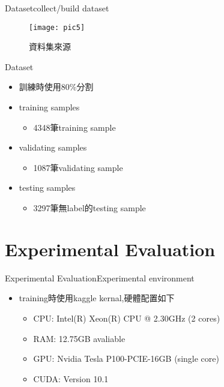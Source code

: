 \documentclass{beamer}
\begin{document}
\begin{CJK}{UTF8}{bsmi}
\begin{frame}{Dataset}{collect/build dataset}
\begin{figure}[H] %
\texttt{[image: pic5]} %
\caption{資料集來源} %
\end{figure}


\end{frame}
\begin{frame}{Dataset}
 \begin{itemize}
  \item {
訓練時使用80\%分割
  }
  \end{itemize}
  \begin{itemize}
  \item {
    training samples  
 	\begin{itemize}
    	\item
     	4348筆training sample
   	 \end{itemize}
  }
  \end{itemize}
 \begin{itemize}
  \item {
   validating samples 
 	\begin{itemize}
    	\item
     	 1087筆validating sample
   	 \end{itemize}
  }
  \end{itemize}
 \begin{itemize}
  \item {
    testing samples 
 	\begin{itemize}
    	\item
     	 3297筆無label的testing sample
   	 \end{itemize}
  }
  \end{itemize}

\end{frame}

\section{Experimental Evaluation}
\begin{frame}{Experimental Evaluation}{Experimental environment}
  \begin{itemize}
  \item {
    training時使用kaggle kernal,硬體配置如下
\begin{itemize}
  \item {
    CPU: Intel(R) Xeon(R) CPU @ 2.30GHz (2 cores)
  }
  \item {
    RAM: 12.75GB avaliable
  }
  \item {
    GPU: Nvidia Tesla P100-PCIE-16GB (single core) 
  }
 \item {
    CUDA: Version 10.1
  }
  \end{itemize}
  }
  \end{itemize}


\end{frame}
\end{CJK}
\end{document}
